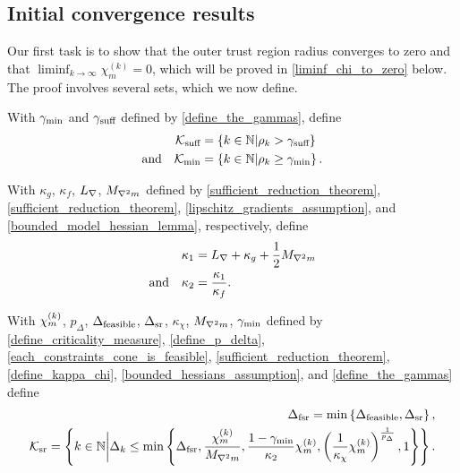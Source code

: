 \subsection{Initial convergence results}

\label{initial_convergence_results}

Our first task is to show that the outer trust region radius converges to zero and that $\liminf_{k \rightarrow\infty} \chi_m^{(k)} =0$, which will be proved in \cref{liminf_chi_to_zero} below.    The proof involves several sets, which we now define.  

With
$\gamma_{\textrm{min}}$ and $\gamma_{\textrm{suff}}$
defined by \cref{define_the_gammas},
define
\begin{align}
{\mathcal K_{\textrm{suff}}} &= \left\{k \in \mathbb N | \rho_k > \gamma_{\textrm{suff}} \right\} \label{define_suffiterates} \\
\textrm{and} \quad {\mathcal K_{\textrm{min}}} &= \left\{k \in \mathbb N | \rho_k \ge \gamma_{\textrm{min}} \right\} \label{define_miniterates}.
\end{align}

With
$\kappa_g$, $\kappa_f$, ${L_{\nabla}}$, ${M_{\nabla^2 m}}$
defined by
\cref{sufficient_reduction_theorem}, \cref{sufficient_reduction_theorem}, \cref{lipschitz_gradients_assumption}, and \cref{bounded_model_hessian_lemma},
respectively,  define
\begin{align}
{\kappa_1} &= {L_{\nabla}} + \kappa_{g} + \frac 1 2 {M_{\nabla^2 m}} \label{define_theircnot} \\
\textrm{and} \quad {\kappa_2} &= \frac{{\kappa_1}}{\kappa_f} .  \label{define_theirc}
\end{align}

With
${\chi_m^{(k)}}$, $p_{\Delta}$, ${\Delta_{\textrm{feasible}}}$, ${\Delta_{\textrm{sr}}}$, $\kappa_{\chi}$, ${M_{\nabla^2 m}}$, $\gamma_{\textrm{min}}$
defined by 
\cref{define_criticality_measure}, \cref{define_p_delta}, 
\cref{each_constraints_cone_is_feasible},
\cref{sufficient_reduction_theorem}, \cref{define_kappa_chi}, \cref{bounded_hessians_assumption}, and \cref{define_the_gammas}
define
\begin{align}
\Delta_{\textrm{fsr}} = \min\left\{{\Delta_{\textrm{feasible}}}, {\Delta_{\textrm{sr}}}\right\}, \label{define_dgood} \\
{\mathcal K_{\textrm{sr}}} = \left \{ k \in \mathbb N \bigg| \Delta_k \le \min \left\{ 
\Delta_{\textrm{fsr}},
\frac {{\chi_m^{(k)}}}{{M_{\nabla^2 m}}}, 
\frac{1-\gamma_{\textrm{min}}}{{\kappa_2}}{\chi_m^{(k)}},
\left(\frac 1 {\kappa_{\chi}}  {\chi_m^{(k)}}\right)^{\frac 1 {p_{\Delta}}}, 
1
\right\} \right \}. \label{define_reduceiterates}
\end{align}

